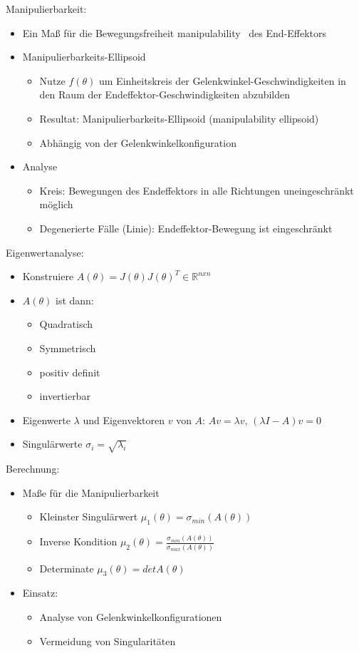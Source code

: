 \documentclass[paper=a4, fontsize=11pt]{scrartcl} %
\numberwithin{equation}{section} %
\numberwithin{figure}{section} %
\numberwithin{table}{section} %
\begin{document}
Manipulierbarkeit:
\begin{itemize}
\item Ein Maß für die Bewegungsfreiheit \glqq manipulability \grqq\ des End-Effektors
\item Manipulierbarkeits-Ellipsoid
\begin{itemize}
\item Nutze $f(\theta)$ um Einheitskreis der Gelenkwinkel-Geschwindigkeiten in den Raum der Endeffektor-Geschwindigkeiten abzubilden
\item Resultat: Manipulierbarkeits-Ellipsoid (manipulability ellipsoid)
\item Abhängig von der Gelenkwinkelkonfiguration
\end{itemize}
\item Analyse
\begin{itemize}
\item Kreis: Bewegungen des Endeffektors in alle Richtungen uneingeschränkt möglich
\item Degenerierte Fälle (Linie): Endeffektor-Bewegung ist eingeschränkt
\end{itemize}
\end{itemize}

Eigenwertanalyse:
\begin{itemize}
\item Konstruiere $A(\theta) = J(\theta) J(\theta)^T \in \mathbb{R}^{n x n}$
\item $A(\theta)$ ist dann:
\begin{itemize}
\item Quadratisch
\item Symmetrisch
\item positiv definit
\item invertierbar
\end{itemize}
\item Eigenwerte $\lambda$ und Eigenvektoren $v$ von $A$: $Av = \lambda v$, $(\lambda I - A) v = 0$
\item Singulärwerte $\sigma_i = \sqrt{\lambda_i}$
\end{itemize}

Berechnung:
\begin{itemize}
\item Maße für die Manipulierbarkeit
\begin{itemize}
\item Kleinster Singulärwert $\mu_1(\theta) = \sigma_{min}(A(\theta))$
\item Inverse Kondition $\mu_2(\theta) = \frac{\sigma_{min}(A(\theta))}{\sigma_{max}(A(\theta))}$
\item Determinate $\mu_3(\theta) = det A(\theta)$
\end{itemize}
\item Einsatz:
\begin{itemize}
\item Analyse von Gelenkwinkelkonfigurationen
\item Vermeidung von Singularitäten
\end{itemize}
\end{itemize}
\end{document}
